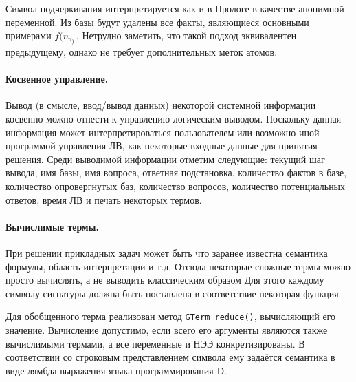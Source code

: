 Символ подчеркивания интерпретируется как и в Прологе в качестве анонимной переменной. Из базы будут удалены все факты, являющиеся основными примерами  $f(n,_)$. Нетрудно заметить, что такой подход эквивалентен предыдущему, однако не требует дополнительных меток атомов.

\paragraph{Косвенное управление.} Вывод (в смысле, ввод/вывод данных) некоторой системной информации косвенно можно отнести к управлению логическим выводом. Поскольку данная информация может интерпретироваться пользователем или возможно иной программой управления ЛВ, как некоторые входные данные для принятия решения. Среди выводимой информации отметим следующие: текущий шаг вывода, имя базы, имя вопроса, ответная подстановка, количество фактов в базе, количество опровергнутых баз, количество вопросов, количество потенциальных ответов, время ЛВ и печать некоторых термов.

\paragraph{Вычислимые термы.} При решении прикладных задач может быть что заранее известна семантика формулы, область интерпретации и т.д. Отсюда некоторые сложные термы можно просто вычислять, а не выводить классическим образом
Для этого каждому символу сигнатуры должна быть поставлена в соответствие некоторая функция.

Для обобщенного терма реализован метод \texttt{GTerm reduce()}, вычисляющий его значение. Вычисление допустимо, если всего его аргументы являются также вычислимыми термами, а все переменные и НЭЭ конкретизированы. В соответствии со строковым представлением символа ему задаётся семантика в виде лямбда выражения языка программирования D.





